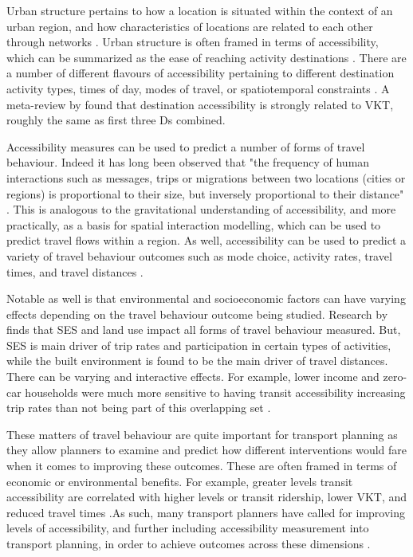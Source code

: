 Urban structure pertains to how a location is situated within the context of an urban region, and how characteristics of locations are related to each other through networks \cite{anas_urban_1998}. Urban structure is often framed in terms of accessibility, which can be summarized as the ease of reaching activity destinations \cite{hansen_how_1959,geurs_accessibility_2004}. There are a number of different flavours of accessibility pertaining to different destination activity types, times of day, modes of travel, or spatiotemporal constraints \cite{geurs_accessibility_2004,levinson_towards_2020}. A meta-review by  found that destination accessibility is strongly related to VKT, roughly the same as first three Ds combined. 

Accessibility measures can be used to predict a number of forms of travel behaviour. Indeed it has long been observed that "the frequency of human interactions such as messages, trips or migrations between two locations (cities or regions) is proportional to their size, but inversely proportional to their distance" \cite{wegener_land-use_2004}. This is analogous to the gravitational understanding of accessibility, and more practically, as a basis for spatial interaction modelling, which can be used to predict travel flows within a region. As well, accessibility can be used to predict a variety of travel behaviour outcomes such as mode choice, activity rates, travel times, and travel distances \cite{ewing_travel_2010,koenig_indicators_1980,badoe_transportationland-use_2000}. 

Notable as well is that environmental and socioeconomic factors can have varying effects depending on the travel behaviour outcome being studied. Research by  finds that SES and land use impact all forms of travel behaviour measured. But, SES is main driver of trip rates and participation in certain types of activities, while the built environment is found to be the main driver of travel distances. There can be varying and interactive effects. For example, lower income and zero-car households were much more sensitive to having transit accessibility increasing trip rates than not being part of this overlapping set \cite{allen_planning_2020}.

These matters of travel behaviour are quite important for transport planning as they allow planners to examine and predict how different interventions would fare when it comes to improving these outcomes. These are often framed in terms of economic or environmental benefits. For example, greater levels transit accessibility are correlated with higher levels or transit ridership, lower VKT, and reduced travel times \cite{badoe_transportationland-use_2000,ewing_travel_2010}.As such, many transport planners have called for improving levels of accessibility, and further including accessibility measurement into transport planning, in order to achieve outcomes across these dimensions \cite{handy_measuring_1997}.

